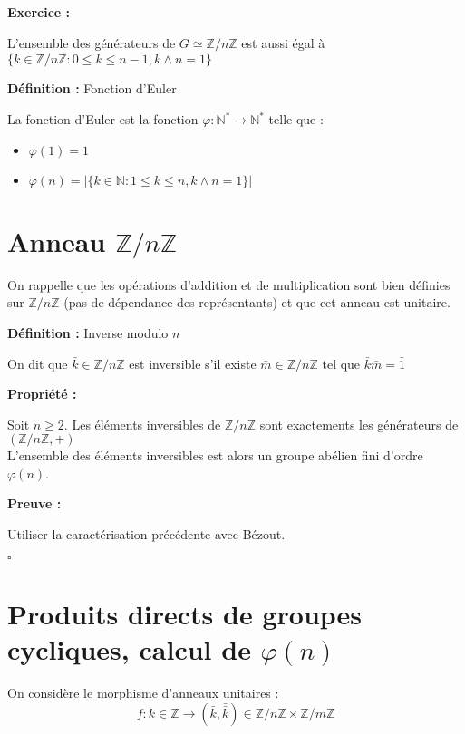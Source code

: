 \documentclass{report}
\renewenvironment{leftbar}{%
  \def\FrameCommand{\vrule width 0.4pt \hspace{10pt}}%
  \MakeFramed {\advance\hsize-\width \FrameRestore}}%
 {\endMakeFramed}%
\newenvironment{definition}[1][]{
    \begin{tcolorbox}[colframe= white]
    \textbf{Définition :} 
    #1 \par
    }
    {\end{tcolorbox}}
\newenvironment{preuve}{\vspace*{0.5cm}
    \begin{leftbar}
    \noindent\textbf{Preuve :}\par}{
    \begin{flushright}
    $\square$
    \end{flushright}
    \end{leftbar}
}
\newenvironment{prop}{\begin{tcolorbox}[colframe= white]
    \textbf{Propriété :}
     \par}
    {\end{tcolorbox}}
\newenvironment{exo}{\begin{tcolorbox}[colframe= white]
    \textbf{Exercice :}
    \par}
    {\end{tcolorbox}}
\begin{document}
\begin{exo}
	L'ensemble des générateurs de $G \simeq \mathbb{Z}/n\mathbb{Z}$ est aussi égal à $\{\bar{k} \in \mathbb{Z}/n\mathbb{Z} : 0 \leq k \leq n-1, k \wedge n =1\}$
\end{exo}

\begin{definition}[Fonction d'Euler]
	La fonction d'Euler est la fonction $\varphi : \mathbb{N}^* \rightarrow \mathbb{N}^*$ telle que :
\begin{itemize}
\item $\varphi (1) = 1$ 
\item $\varphi (n) = | \{k \in \mathbb{N} : 1 \leq k \leq n, k \wedge n =1 \}|$
		
\end{itemize}
\end{definition}




\section{\texorpdfstring{Anneau $\mathbb{Z}/n\mathbb{Z}$}{Anneau Z/nZ}}

On rappelle que les opérations d'addition et de multiplication sont bien définies sur $\mathbb{Z}/n\mathbb{Z}$ (pas de dépendance des représentants) et que cet anneau est unitaire. 

\begin{definition}[Inverse modulo $n$]
On dit que $\bar{k}\in \mathbb{Z}/n\mathbb{Z}$ est inversible s'il existe $\bar{m} \in \mathbb{Z}/n\mathbb{Z}$ tel que $\bar{k}\bar{m}=\bar{1}$
\end{definition}

\begin{prop}
	Soit $n \geq 2$. Les éléments inversibles de $\mathbb{Z}/n\mathbb{Z}$ sont exactements les générateurs de $\left (\mathbb{Z}/n\mathbb{Z}, + \right)$ \\
	L'ensemble des éléments inversibles est alors un groupe abélien fini d'ordre $\varphi (n)$.
\end{prop}
\begin{preuve}
	Utiliser la caractérisation précédente avec Bézout.
\end{preuve}

\section{\texorpdfstring{Produits directs de groupes cycliques, calcul de $\varphi (n)$}{Produits, directs de groupes cycliques, indicatrice d'Euler}}
On considère le morphisme d'anneaux unitaires : $$f : k\in \mathbb{Z} \to (\bar{k}, \bar{\bar{k}}) \in \mathbb{Z}/n\mathbb{Z} \times \mathbb{Z}/m\mathbb{Z}$$
\end{document}
